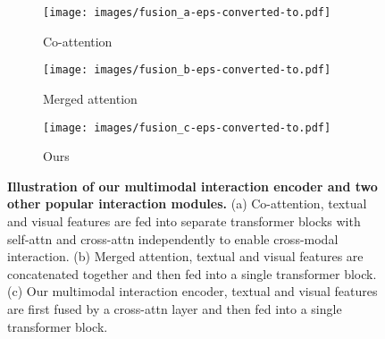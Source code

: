 \documentclass[10pt,twocolumn,letterpaper]{article}
\begin{document}
\begin{figure}[ht]
  \centering
  \begin{subfigure}[t]{0.38\linewidth}
    \centerline{\texttt{[image: images/fusion\_a-eps-converted-to.pdf]}}
    \caption{Co-attention}
    \label{fig4:a}
  \end{subfigure}
  \centering
  \begin{subfigure}[t]{0.3\linewidth}
    \centerline{\texttt{[image: images/fusion\_b-eps-converted-to.pdf]}}
    \caption{Merged attention}
    \label{fig4:b}
  \end{subfigure}
  \centering
  \begin{subfigure}[t]{0.3\linewidth}
    \centerline{\texttt{[image: images/fusion\_c-eps-converted-to.pdf]}}
    \caption{Ours}
    \label{fig4:c}
  \end{subfigure}

  \caption{\textbf{Illustration of our multimodal interaction encoder and two other popular interaction modules.} (a) Co-attention, textual and visual features are fed into separate transformer blocks with self-attn and cross-attn independently to enable cross-modal interaction. (b) Merged attention, textual and visual features are concatenated together and then fed into a single transformer block. (c) Our multimodal interaction encoder, textual and visual features are first fused by a cross-attn layer and then fed into a single transformer block.}
  \label{fig4}
\end{figure}
\end{document}
